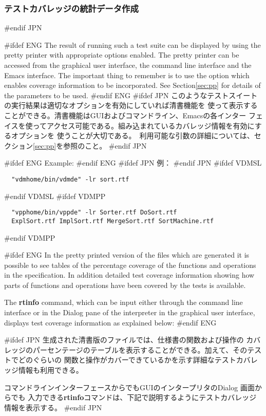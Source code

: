 \documentclass[\pformat,12pt]{article}
\newcommand{\guicmd}[1]{{\sf #1}}
\newcommand{\guicmd}[1]{{\gt #1}}
\begin{document}
\subsubsection{テストカバレッジの統計データ作成}
#endif JPN

#ifdef ENG
The result of running such a test suite can be displayed by using the
pretty printer with appropriate options enabled.  The pretty printer
can be accessed from the graphical user interface, the command
line interface and the Emacs interface. The important thing to
remember is to use the option which enables coverage information to be
incorporated. See Section\ref{sec:pp} for details of the
parameters to be used.
#endif ENG
#ifdef JPN
このようなテストスイートの実行結果は適切なオプションを有効にしていれば清書機能を
使って表示することができる。清書機能はGUIおよびコマンドライン、Emacsの各インター
フェイスを使ってアクセス可能である。組み込まれているカバレッジ情報を有効にするオプションを
使うことが大切である。　利用可能な引数の詳細については、セクション\ref{sec:pp}を参照のこと。
#endif JPN

#ifdef ENG
Example:
#endif ENG
#ifdef JPN
例：
#endif JPN
#ifdef VDMSL
\begin{verbatim}
  "vdmhome/bin/vdmde" -lr sort.rtf
\end{verbatim}
#endif VDMSL
#ifdef VDMPP
\begin{verbatim}
  "vpphome/bin/vppde" -lr Sorter.rtf DoSort.rtf
  ExplSort.rtf ImplSort.rtf MergeSort.rtf SortMachine.rtf
\end{verbatim}
#endif VDMPP

#ifdef ENG
In the pretty printed version of the files which are generated it is
possible to see tables of the percentage coverage of the functions
and operations in the specification. In addition detailed test
coverage information showing how parts of functions and operations
have been covered by the tests is available.

The \textbf{rtinfo} command, which can be input either through the command
line interface or in the \guicmd{Dialog} pane of the interpreter in  the
graphical user interface, displays test coverage information as
explained below:
#endif ENG

#ifdef JPN
生成された清書版のファイルでは、仕様書の関数および操作の
カバレッジのパーセンテージのテーブルを表示することができる。加えて、そのテストでどのぐらいの
関数と操作がカバーできているかを示す詳細なテストカバレッジ情報も利用できる。

コマンドラインインターフェースからでもGUIのインタープリタの\guicmd{Dialog} 画面からでも
入力できる\textbf{rtinfo}コマンドは、下記で説明するようにテストカバレッジ情報を表示する。
#endif JPN
\end{document}
